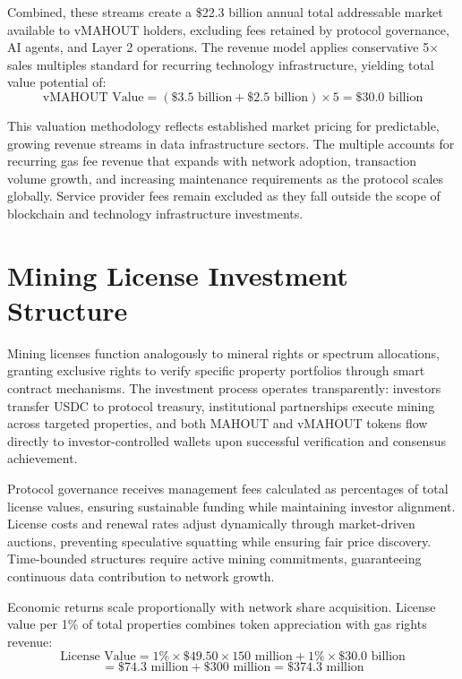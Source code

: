 Combined, these streams create a \$22.3 billion annual total addressable market available to vMAHOUT holders, excluding fees retained by protocol governance, AI agents, and Layer 2 operations. The revenue model applies conservative 5\(\times\) sales multiples standard for recurring technology infrastructure, yielding total value potential of:
\[
\text{vMAHOUT Value} = (\$3.5 \text{ billion} + \$2.5 \text{ billion}) \times 5 = \$30.0 \text{ billion}
\]

This valuation methodology reflects established market pricing for predictable, growing revenue streams in data infrastructure sectors. The multiple accounts for recurring gas fee revenue that expands with network adoption, transaction volume growth, and increasing maintenance requirements as the protocol scales globally. Service provider fees remain excluded as they fall outside the scope of blockchain and technology infrastructure investments.

\section{Mining License Investment Structure}

Mining licenses function analogously to mineral rights or spectrum allocations, granting exclusive rights to verify specific property portfolios through smart contract mechanisms. The investment process operates transparently: investors transfer USDC to protocol treasury, institutional partnerships execute mining across targeted properties, and both MAHOUT and vMAHOUT tokens flow directly to investor-controlled wallets upon successful verification and consensus achievement.

Protocol governance receives management fees calculated as percentages of total license values, ensuring sustainable funding while maintaining investor alignment. License costs and renewal rates adjust dynamically through market-driven auctions, preventing speculative squatting while ensuring fair price discovery. Time-bounded structures require active mining commitments, guaranteeing continuous data contribution to network growth.

Economic returns scale proportionally with network share acquisition. License value per 1\% of total properties combines token appreciation with gas rights revenue:
\[
\text{License Value} = 1\% \times \$49.50 \times 150 \text{ million} + 1\% \times \$30.0 \text{ billion}
\]
\[
= \$74.3 \text{ million} + \$300 \text{ million} = \$374.3 \text{ million}
\]

